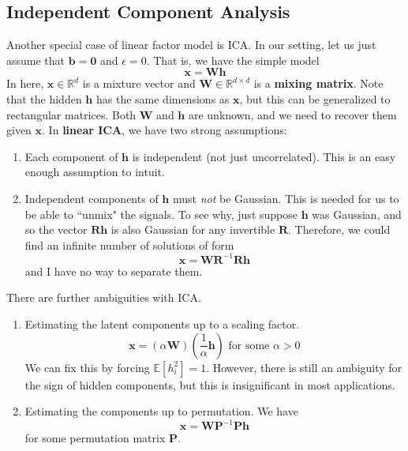 \documentclass{article}
\begin{document}
  \subsection{Independent Component Analysis} 

    Another special case of linear factor model is ICA. In our setting, let us just assume that $\mathbf{b} = \mathbf{0}$ and $\epsilon = 0$. That is, we have the simple model 
    \[\mathbf{x} = \mathbf{W} \mathbf{h}\] 
    In here, $\mathbf{x} \in \mathbb{R}^d$ is a mixture vector and $\mathbf{W} \in \mathbb{R}^{d \times d}$ is a \textbf{mixing matrix}. Note that the hidden $\mathbf{h}$ has the same dimensions as $\mathbf{x}$, but this can be generalized to rectangular matrices. Both $\mathbf{W}$ and $\mathbf{h}$ are unknown, and we need to recover them given $\mathbf{x}$. In \textbf{linear ICA}, we have two strong assumptions: 
    \begin{enumerate} 
        \item Each component of $\mathbf{h}$ is independent (not just uncorrelated). This is an easy enough assumption to intuit.  
        \item Independent components of $\mathbf{h}$ must \textit{not} be Gaussian. This is needed for us to be able to ``unmix" the signals. To see why, just suppose $\mathbf{h}$ was Gaussian, and so the vector $\mathbf{R} \mathbf{h}$ is also Gaussian for any invertible $\mathbf{R}$. Therefore, we could find an infinite number of solutions of form 
        \[\mathbf{x} = \mathbf{W} \mathbf{R}^{-1} \mathbf{R} \mathbf{h}\]
        and I have no way to separate them. 
    \end{enumerate}

    There are further ambiguities with ICA. 
    \begin{enumerate}
        \item Estimating the latent components up to a scaling factor. 
            \[\mathbf{x} = (\alpha \mathbf{W}) (\frac{1}{\alpha} \mathbf{h}) \text{ for some } \alpha > 0\]
            We can fix this by forcing $\mathbb{E}[h_i^2] = 1$. However, there is still an ambiguity for the sign of hidden components, but this is insignificant in most applications. 

        \item Estimating the components up to permutation. We have 
            \[\mathbf{x} = \mathbf{W} \mathbf{P}^{-1} \mathbf{P} \mathbf{h}\] 
            for some permutation matrix $\mathbf{P}$. 
    \end{enumerate}
\end{document}
